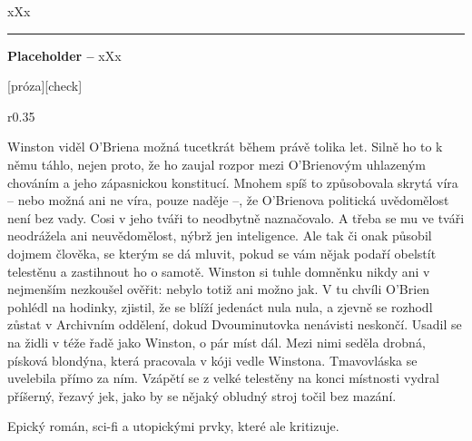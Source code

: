 \documentclass{extarticle} %
\begin{document}
\noindent 
xXx

\vfill

\noindent\begin{minipage}{\textwidth}
    {\textcolor{\wpagecolor}{\rule{\linewidth}{0.4pt}}
    \footnotesize
    \textbf{Placeholder --} xXx
    }
\end{minipage}

\newpage


\changefontsize{7pt}

[próza][check]

\noindent\begin{wrapfigure}{r}{0.35\textwidth}
\tiny

\setlength{\parindent}{3pt}\setlength{\parskip}{0.5em}
Winston viděl O’Briena možná tucetkrát během právě tolika let.
Silně ho to k němu táhlo, nejen proto, že ho zaujal rozpor mezi O’Brienovým uhlazeným chováním
a jeho zápasnickou konstitucí.
Mnohem spíš to způsobovala skrytá víra – nebo možná ani ne víra, pouze naděje –,
že O’Brienova politická uvědomělost není bez vady.
Cosi v jeho tváři to neodbytně naznačovalo.
A třeba se mu ve tváři neodrážela ani neuvědomělost, nýbrž jen inteligence.
Ale tak či onak působil dojmem člověka, se kterým se dá mluvit,
pokud se vám nějak podaří obelstít telestěnu a zastihnout ho o samotě.
Winston si tuhle domněnku nikdy ani v nejmenším nezkoušel ověřit: nebylo totiž ani možno jak.
V tu chvíli O’Brien pohlédl na hodinky, zjistil, že se blíží jedenáct nula nula,
a zjevně se rozhodl zůstat v Archivním oddělení, dokud Dvouminutovka nenávisti neskončí.
Usadil se na židli v téže řadě jako Winston, o pár míst dál.
Mezi nimi seděla drobná, písková blondýna, která pracovala v kóji vedle Winstona.
Tmavovláska se uvelebila přímo za ním.
Vzápětí se z velké telestěny na konci místnosti vydral příšerný, řezavý jek,
jako by se nějaký obludný stroj točil bez mazání.
\end{wrapfigure}


\noindent 
Epický román, sci-fi a utopickými prvky, které ale kritizuje.



\end{document}
